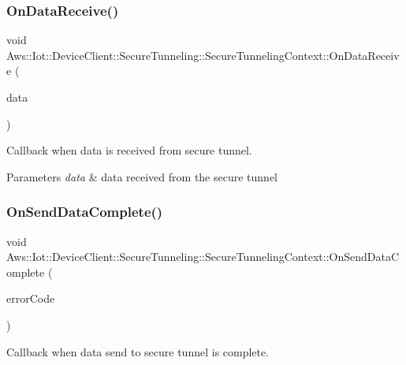 \subsubsection{\texorpdfstring{On\+Data\+Receive()}{OnDataReceive()}}
{\footnotesize\ttfamily void Aws\+::\+Iot\+::\+Device\+Client\+::\+Secure\+Tunneling\+::\+Secure\+Tunneling\+Context\+::\+On\+Data\+Receive (\begin{DoxyParamCaption}\item[{const Crt\+::\+Byte\+Buf \&}]{data }\end{DoxyParamCaption})\hspace{0.3cm}{\ttfamily [private]}}



Callback when data is received from secure tunnel. 


\begin{DoxyParams}{Parameters}
{\em data} & data received from the secure tunnel \\
\hline
\end{DoxyParams}
\mbox{\label{class_aws_1_1_iot_1_1_device_client_1_1_secure_tunneling_1_1_secure_tunneling_context_ae65a8bbb27479f1310a708f354c35b9d}} 
\subsubsection{\texorpdfstring{On\+Send\+Data\+Complete()}{OnSendDataComplete()}}
{\footnotesize\ttfamily void Aws\+::\+Iot\+::\+Device\+Client\+::\+Secure\+Tunneling\+::\+Secure\+Tunneling\+Context\+::\+On\+Send\+Data\+Complete (\begin{DoxyParamCaption}\item[{int}]{error\+Code }\end{DoxyParamCaption})\hspace{0.3cm}{\ttfamily [private]}}



Callback when data send to secure tunnel is complete. 


